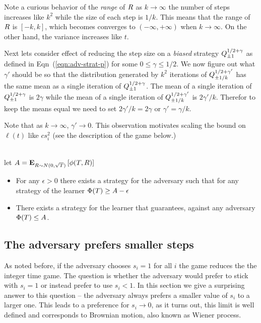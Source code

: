 \documentclass[12pt]{article} %
\begin{document}
Note a curious behavior of the {\em range} of $R$ as $k \to \infty$
the number of steps increases like $k^2$ while the size of each step
is $1/k$. This means that the range of $R$ is $[-k,k]$, which becomes
converges to $(-\infty, + \infty)$ when $k \to \infty$. On the other
hand, the variance increases like $t$.

Next lets consider effect of reducing the step size on a {\em biased}
strategy $Q^{1/2+\gamma}_{\pm 1}$ as defined in
Eqn~(\ref{eqn:adv-strat-p}) for some
$0\leq \gamma \leq 1/2$.  We now figure out what  $\gamma'$ should be
so that the distribution generated by $k^2$ iterations of $Q^{1/2+\gamma'}_{\pm 1/k}$ has the
same mean as a single iteration of $Q^{1/2+\gamma}_{\pm
  1}$. The mean of a single iteration of
$Q^{1/2+\gamma}_{\pm 1}$ is $2\gamma$ while the mean of a
single iteration of $Q^{1/2+\gamma'}_{\pm 1/k}$ is
$2\gamma'/k$. Therefor to keep the means equal we need to set
$2\gamma'/k = 2\gamma$ or $\gamma' = \gamma/k$.


Note that as $k \to \infty$, $\gamma' \to 0$. This observation
motivates scaling the bound on $\ell(t)$ like $c s_i^2$ (see the
description of the game below.)
\fi

\begin{theorem}
  ~\\

   let $A = {\bf E}_{R \sim N(0,\sqrt{T})}\left[ \phi(T,R) \right]$
   \begin{itemize}
     \item
    For any $\epsilon>0$ there exists a strategy for the adversary
    such that for any strategy of the learner $\Phi(T) \geq A-\epsilon$
  \item
    There exists a strategy for the learner that guarantees, against
    any adversary $\Phi(T) \leq A$.
  \end{itemize}
\end{theorem}


\subsection{The adversary prefers smaller steps} \label{sec:smallsteps}
As noted before, if the adversary chooses $s_i=1$ for all $i$ the game
reduces the the integer time game. The question is whether the
adversary would prefer to stick with $s_i=1$ or instead prefer to use
$s_i<1$. In this section we give a surprising answer to this question
-- the adversary always prefers a smaller value of $s_i$ to a larger
one. This leads to a preference for $s_i \to 0$, as it turns out, this
limit is well defined and corresponds to Brownian motion, also known as
Wiener process.
\end{document}
